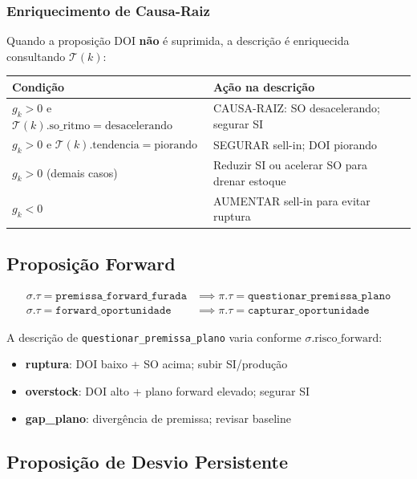\documentclass[a4paper, 12pt]{report}
\theoremstyle{definition}
\theoremstyle{remark}
\begin{document}
\subsubsection{Enriquecimento de Causa-Raiz}

Quando a proposi\c{c}\~ao DOI \textbf{n\~ao} \'e suprimida, a descri\c{c}\~ao
\'e enriquecida consultando $\mathcal{T}(k)$:

\begin{center}
\begin{tabular}{llp{5cm}}
  \toprule
  \textbf{Condi\c{c}\~ao} & \textbf{A\c{c}\~ao na descri\c{c}\~ao} \\
  \midrule
  $g_k > 0$ e $\mathcal{T}(k).\text{so\_ritmo} = \text{desacelerando}$ &
    CAUSA-RAIZ: SO desacelerando; segurar SI \\
  $g_k > 0$ e $\mathcal{T}(k).\text{tendencia} = \text{piorando}$ &
    SEGURAR sell-in; DOI piorando \\
  $g_k > 0$ (demais casos) &
    Reduzir SI ou acelerar SO para drenar estoque \\
  $g_k < 0$ &
    AUMENTAR sell-in para evitar ruptura \\
  \bottomrule
\end{tabular}
\end{center}


\subsection{Proposi\c{c}\~ao Forward}

\begin{align}
  \sigma.\tau = \texttt{premissa\_forward\_furada} &\implies
  \pi.\tau = \texttt{questionar\_premissa\_plano} \\
  \sigma.\tau = \texttt{forward\_oportunidade} &\implies
  \pi.\tau = \texttt{capturar\_oportunidade}
\end{align}

A descri\c{c}\~ao de \texttt{questionar\_premissa\_plano} varia conforme
$\sigma.\text{risco\_forward}$:
\begin{itemize}
  \item \textbf{ruptura}: DOI baixo + SO acima; subir SI/produ\c{c}\~ao
  \item \textbf{overstock}: DOI alto + plano forward elevado; segurar SI
  \item \textbf{gap\_plano}: diverg\^encia de premissa; revisar baseline
\end{itemize}


\subsection{Proposi\c{c}\~ao de Desvio Persistente}
\end{document}
